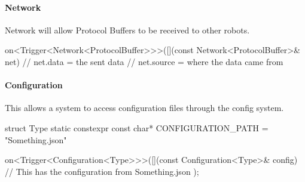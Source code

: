\documentclass[a4paper]{article}
\begin{document}
	\paragraph{Network} Network will allow Protocol Buffers to be received to other robots.\\
	\begin{cppcode}
		on<Trigger<Network<ProtocolBuffer>>>([](const Network<ProtocolBuffer>& net) {
			// net.data = the sent data
			// net.source = where the data came from
		}
	\end{cppcode}

	\paragraph{Configuration} This allows a system to access configuration files through the config system.\\
	\begin{cppcode}
		struct Type {
			static constexpr const char* CONFIGURATION_PATH = "Something.json"
		}

		on<Trigger<Configuration<Type>>>([](const Configuration<Type>& config) {
			// This has the configuration from Something.json
		});
	\end{cppcode}
\end{document}
